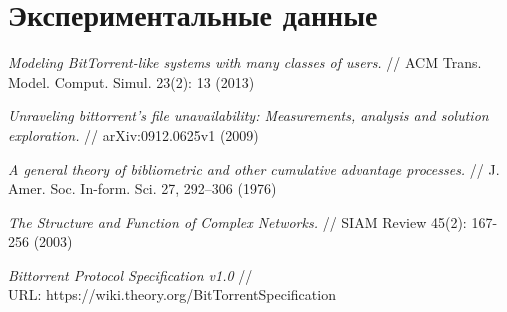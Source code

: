 \documentclass{matmex-diploma-custom}
\theoremstyle{named}
\begin{document}
\section*{Экспериментальные данные}



\begin{thebibliography}{XXXX}
	{%
			\renewcommand{\baselinestretch}{1.01}
			\selectfont
			
		{\em Modeling BitTorrent-like systems with many classes of users.}
		// ACM Trans. Model. Comput. Simul. 23(2): 13 (2013)
			
		{\em Unraveling bittorrent's file unavailability: Measurements, analysis and solution exploration.}
		// arXiv:0912.0625v1 (2009)
				
		{\em A general theory of bibliometric and other cumulative advantage processes.} 
		// J. Amer. Soc. In-form. Sci. 27, 292–306 (1976)
	
		{\em The Structure and Function of Complex Networks.}
		// SIAM Review 45(2): 167-256 (2003)

		{\em Bittorrent Protocol Specification v1.0} //
		\\ URL: https://wiki.theory.org/BitTorrentSpecification

	}%
\end{thebibliography}
	
\end{document}
